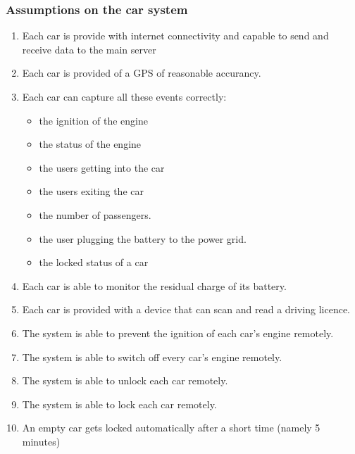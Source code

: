 \documentclass[11pt]{article} %
\begin{document}
\subsubsection{Assumptions on the car system}
\begin{enumerate}
	\item  Each car is provide with internet connectivity and capable to send and receive data to the main server
	\item  Each car is provided of a GPS of reasonable accurancy.
	\item  Each car can capture all these events correctly:
		\begin{itemize}
			\item the ignition of the engine
			\item the status of the engine
			\item the users getting into the car
			\item the users exiting the car 
			\item the number of passengers.
			\item the user plugging the battery to the power grid.
			\item the locked status of a car
		\end{itemize}
	\item Each car is able to monitor the residual charge of its battery.
	\item Each car is provided with a device that can scan and read a driving licence.
	\item The system is able to prevent the ignition of each car's engine remotely.
	\item The system is able to switch off every car's engine remotely.
	\item The system is able to unlock each car remotely.
	\item The system is able to lock each car remotely.
	\item An empty car gets locked automatically after a short time (namely 5 minutes)
\end{enumerate}
\end{document}
